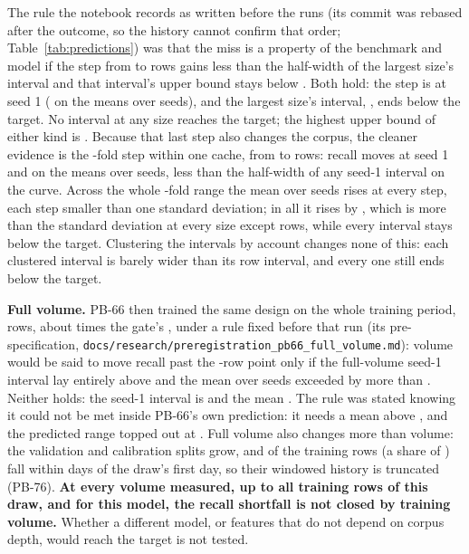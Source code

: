 The rule the notebook records as written before the runs (its commit was rebased after the outcome,
so the history cannot confirm that order; Table~\ref{tab:predictions}) was that the miss is a property of the benchmark and model if the step from
\nLcTrainC{} to \nLcTrainD{} rows gains less than the half-width of the largest size's interval and
that interval's upper bound stays below \nTargetRecall{}. Both hold: the step is \nLcStepCD{} at seed 1
(\nLcSeedStepCD{} on the means over seeds), and the largest size's interval, \nLcRecallciD{}, ends
below the target. No interval at any size reaches the target; the highest upper bound of
either kind is \nLcMaxUpper{}. Because that last step also changes the corpus, the cleaner evidence is the
\nLcVolumeFactorAC{}-fold step within one cache, from \nLcTrainA{} to \nLcTrainC{} rows: recall moves
\nLcStepAC{} at seed 1 and \nLcSeedGainAC{} on the means over seeds, less than the half-width of any
seed-1 interval on the curve. Across the whole \nLcVolumeFactor{}-fold range the mean over seeds
rises at every step, each step smaller than one standard deviation; in all it rises by
\nLcSeedGain{}, which is more than the standard deviation at every size except \nLcTrainB{} rows,
while every interval stays below the target.
Clustering the intervals by account changes none of this: each clustered interval is barely wider
than its row interval, and every one still ends below the target.

\textbf{Full volume.} PB-66 then trained the same design on the whole training period,
\nFvTrainRows{} rows, about \nFullVolumeFactor{} times the gate's \nTrainUsed{}, under a rule fixed
before that run (its pre-specification, \texttt{docs/research/preregistration\_pb66\_full\_volume.md}):
volume would be said to move recall past the \nLcTrainD{}-row point only if the full-volume seed-1
interval lay entirely above \nFvRuleBound{} and the mean over \nSeeds{} seeds exceeded \nFvRuleMean{} by more
than \nFvRuleMargin{}. Neither holds: the seed-1 interval is \nFvRecallSixci{} and the mean
\nFvSeedRecallSix{}. The rule was stated knowing it could not be met inside PB-66's own prediction:
it needs a mean above \nFvRuleNeeded{}, and the predicted range topped out at \nFvPredTop{}. Full
volume also changes more than volume: the validation and calibration splits grow, and
\nFvTruncated{} of the training rows (a share of \nFvTruncatedShare{}) fall within
\nFvTruncatedDays{} days of the draw's first day, so their windowed history is truncated (PB-76).
\textbf{At every volume measured, up to all \nFvTrainRows{} training rows of this draw, and for this
model, the recall shortfall is not closed by training volume.} Whether a different model, or features
that do not depend on corpus depth, would reach the target is not tested.

